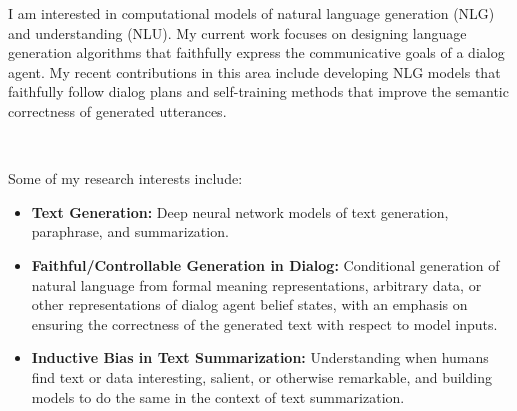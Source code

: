 \documentclass{scrartcl}
\begin{document}
\begin{cv}{}
\noindent I am interested in computational models of natural language generation (NLG) and understanding (NLU). My current work focuses on designing
language generation algorithms that faithfully express the communicative goals 
of a dialog agent. My recent contributions in this area include developing
NLG models that faithfully follow dialog plans and self-training
methods that improve the semantic correctness of
generated utterances. 





%
~

\noindent Some of my research interests include:

\begin{itemize}
    \item \textbf{Text Generation:} Deep neural network models of text generation, paraphrase, and summarization.
    \item \textbf{Faithful/Controllable Generation in Dialog:} Conditional generation of natural language from formal meaning representations, arbitrary data, or other representations of dialog agent belief states, 
        with an emphasis on ensuring the correctness of the generated text with respect to model inputs.
    \item \textbf{Inductive Bias in Text Summarization:} Understanding when humans find text or data interesting, salient, or otherwise remarkable, and building models to do the same in the context of text summarization.
\end{itemize}



\end{cv}
\end{document}
